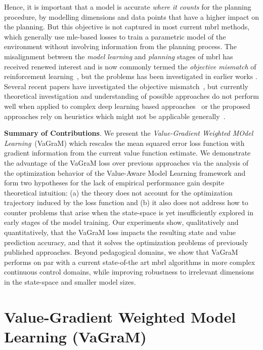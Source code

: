 Hence, it is important that a model is accurate \textit{where it counts} for the planning procedure, by modelling dimensions and data points that have a higher impact on the planning.
But this objective is not captured in most current \ac{mbrl} methods, which generally use \ac{mle}-based losses to train a parametric model of the environment without involving information from the planning process.
The misalignment between the \emph{model learning} and \emph{planning} stages of \ac{mbrl} has received renewed interest and is now commonly termed the \textit{objective mismatch} of reinforcement learning~\parencite{lambert202objective}, but the problems has been investigated in earlier works \parencite{joseph2013reinforcement}.
Several recent papers have investigated the objective mismatch~\parencite{abachi2020policy,zhang2021learning,ayoub2020model,grimm2020value,grimm2021proper,nikishin2021control}, but currently theoretical investigation and understanding of possible approaches do not perform well when applied to complex deep learning based approaches~\parencite{lovatto2020decision} or the proposed approaches rely on heuristics which might not be applicable generally~\parencite{nair2020goal}.

\noindent \textbf{Summary of Contributions}. We present the \textit{Value-Gradient Weighted MOdel Learning}~(VaGraM) which rescales the mean squared error loss function with gradient information from the current value function estimate.
We demonstrate the advantage of the VaGraM loss over previous approaches via the analysis of the optimization behavior of the Value-Aware Model Learning framework \parencite{vaml, itervaml} and form two hypotheses for the lack of empirical performance gain despite theoretical intuition: (a) the theory does not account for the optimization trajectory induced by the loss function and (b) it also does not address how to counter problems that arise when the state-space is yet insufficiently explored in early stages of the model training.
Our experiments show, qualitatively and quantitatively, that the VaGraM loss impacts the resulting state and value prediction accuracy, and that it solves the optimization problems of previously published approaches.
Beyond pedagogical domains, we show that VaGraM performs on par with a current state-of-the art \ac{mbrl} algorithms in more complex continuous control domains, while improving robustness to irrelevant dimensions in the state-space and smaller model sizes.



\section{Value-Gradient Weighted Model Learning (VaGraM)}
\label{sec:vagram:method}

